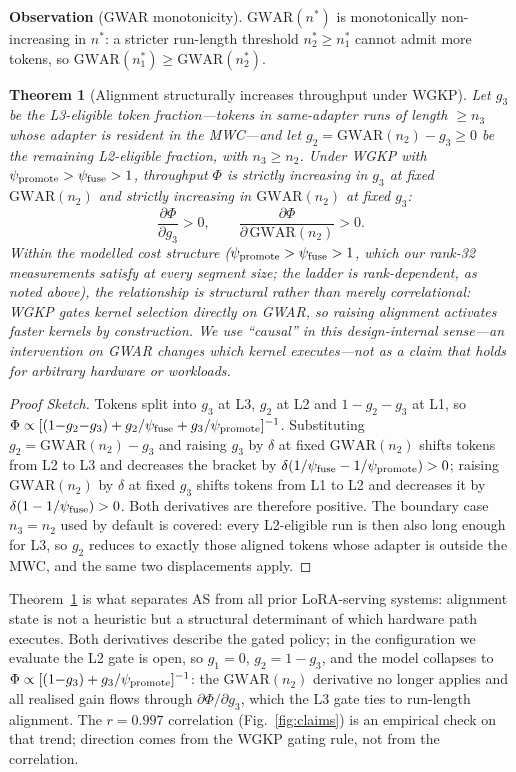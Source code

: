 \documentclass[conference]{IEEEtran}
\newtheorem{theorem}{Theorem}
\newcommand{\asys}{AS\xspace}
\newcommand{\gwar}[1]{\ensuremath{\mathrm{GWAR}(#1)}\xspace}
\begin{document}
\textbf{Observation} (GWAR monotonicity).
$\gwar{n^*}$ is monotonically non-increasing in $n^*$: a stricter run-length
threshold $n^*_2 \geq n^*_1$ cannot admit more tokens, so
$\gwar{n^*_1} \geq \gwar{n^*_2}$.

\begin{theorem}[Alignment structurally increases throughput under WGKP]
\label{thm:causal}
Let $g_3$ be the L3-eligible token fraction---tokens in same-adapter runs of
length ${\geq}n_3$ \emph{whose adapter is resident in the MWC}---and let
$g_2 {=} \gwar{n_2} {-} g_3 \geq 0$ be the remaining L2-eligible fraction, with
$n_3 \geq n_2$.  Under WGKP with
$\psi_{\rm promote} > \psi_{\rm fuse} > 1$, throughput $\Phi$ is strictly
increasing in $g_3$ at fixed $\gwar{n_2}$ and strictly increasing in $\gwar{n_2}$
at fixed $g_3$:
\[
  \frac{\partial\Phi}{\partial g_3} > 0,
  \qquad
  \frac{\partial\Phi}{\partial\,\gwar{n_2}} > 0 .
\]
Within the modelled cost structure ($\psi_{\rm promote}>\psi_{\rm fuse}>1$, which
our rank-32 measurements satisfy at every segment size; the ladder is
rank-dependent, as noted above), the
relationship is structural rather than merely correlational: WGKP gates kernel
selection directly on GWAR, so raising alignment activates faster kernels by
construction. We use ``causal'' in this design-internal sense---an intervention
on GWAR changes which kernel executes---not as a claim that holds for arbitrary
hardware or workloads.
\end{theorem}

\begin{proof}[Proof Sketch]
Tokens split into $g_3$ at L3, $g_2$ at L2 and $1{-}g_2{-}g_3$ at L1, so
$\Phi \propto [(1{-}g_2{-}g_3) + g_2/\psi_{\rm fuse} + g_3/\psi_{\rm promote}]^{-1}$.
Substituting $g_2 {=} \gwar{n_2}{-}g_3$ and raising $g_3$ by $\delta$ at fixed
$\gwar{n_2}$ shifts tokens from L2 to L3 and decreases the bracket by
$\delta(1/\psi_{\rm fuse}-1/\psi_{\rm promote}) > 0$;
raising $\gwar{n_2}$ by $\delta$ at fixed $g_3$ shifts tokens from L1 to L2 and
decreases it by $\delta(1-1/\psi_{\rm fuse}) > 0$.  Both derivatives are therefore
positive.
The boundary case $n_3{=}n_2$ used by default is covered: every L2-eligible run is
then also long enough for L3, so $g_2$ reduces to exactly those aligned tokens
whose adapter is outside the MWC, and the same two displacements apply.
\end{proof}

Theorem~\ref{thm:causal} is what separates \asys from all prior LoRA-serving
systems: alignment state is not a heuristic but a structural determinant
of which hardware path executes.  Both derivatives describe the gated policy;
in the configuration we evaluate the L2 gate is open, so $g_1{=}0$,
$g_2{=}1{-}g_3$, and the model collapses to
$\Phi \propto [(1{-}g_3)+g_3/\psi_{\rm promote}]^{-1}$: the $\gwar{n_2}$
derivative no longer applies and all realised gain flows through
$\partial\Phi/\partial g_3$, which the L3 gate ties to run-length alignment.
The $r{=}0.997$ correlation (Fig.~\ref{fig:claims}) is an empirical check on
that trend; direction comes from the WGKP gating rule, not from the
correlation.
\end{document}
